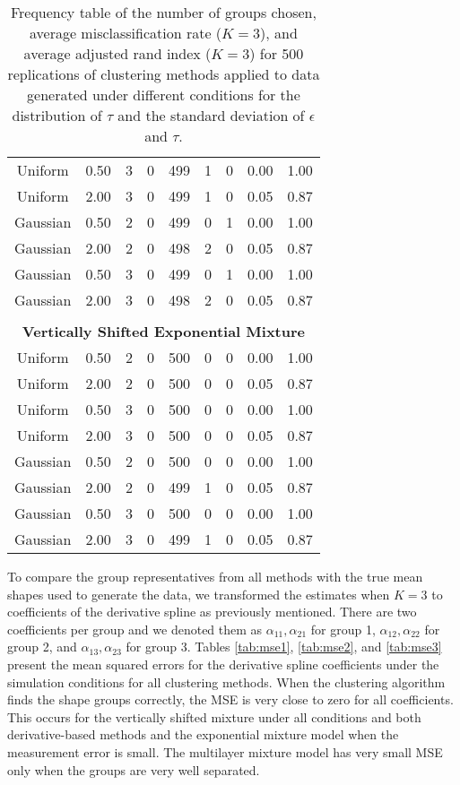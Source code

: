 \begin{table}[ht]
\begin{center}
\begin{tabular}{ccc|cccccc}
  Uniform & 0.50 &   3 & 0 & 499 & 1 & 0 & 0.00 & 1.00 \\ 
  Uniform & 2.00 &   3 & 0 & 499 & 1 & 0 & 0.05 & 0.87 \\ 
  Gaussian & 0.50 &   2 & 0 & 499 & 0 & 1 & 0.00 & 1.00 \\ 
  Gaussian & 2.00 &   2 & 0 & 498 & 2 & 0 & 0.05 & 0.87 \\ 
  Gaussian & 0.50 &   3 & 0 & 499 & 0 & 1 & 0.00 & 1.00 \\ 
  Gaussian & 2.00 &   3 & 0 & 498 & 2 & 0 & 0.05 & 0.87 \\ 
   \\ \multicolumn{9}{c}{\textbf{Vertically Shifted Exponential Mixture}}\\Uniform & 0.50 &   2 & 0 & 500 & 0 & 0 & 0.00 & 1.00 \\ 
  Uniform & 2.00 &   2 & 0 & 500 & 0 & 0 & 0.05 & 0.87 \\ 
  Uniform & 0.50 &   3 & 0 & 500 & 0 & 0 & 0.00 & 1.00 \\ 
  Uniform & 2.00 &   3 & 0 & 500 & 0 & 0 & 0.05 & 0.87 \\ 
  Gaussian & 0.50 &   2 & 0 & 500 & 0 & 0 & 0.00 & 1.00 \\ 
  Gaussian & 2.00 &   2 & 0 & 499 & 1 & 0 & 0.05 & 0.87 \\ 
  Gaussian & 0.50 &   3 & 0 & 500 & 0 & 0 & 0.00 & 1.00 \\ 
  Gaussian & 2.00 &   3 & 0 & 499 & 1 & 0 & 0.05 & 0.87 \\ 
   \hline\end{tabular}
\caption{Frequency table of the number of groups chosen, average misclassification rate ($K=3$), and average adjusted rand index ($K=3$) for 500 replications of clustering methods applied to data generated under different conditions for the distribution of $\tau$ and the standard deviation of $\epsilon$ and $\tau$.}
\label{tab:freq3}
\end{center}
\end{table}
To compare the group representatives from all methods with the true mean shapes used to generate the data, we transformed the estimates when $K=3$ to coefficients of the derivative spline as previously mentioned. There are two coefficients per group and we denoted them as $\alpha_{11},\alpha_{21}$ for group 1, $\alpha_{12},\alpha_{22}$ for group 2, and $\alpha_{13},\alpha_{23}$ for group 3. Tables \ref{tab:mse1}, \ref{tab:mse2}, and \ref{tab:mse3} present the mean squared errors for the derivative spline coefficients under the simulation conditions for all clustering methods. When the clustering algorithm finds the shape groups correctly, the MSE is very close to zero for all coefficients. This occurs for the vertically shifted mixture under all conditions and both derivative-based methods and the exponential mixture model when the measurement error is small. The multilayer mixture model has very small MSE only when the groups are very well separated.

